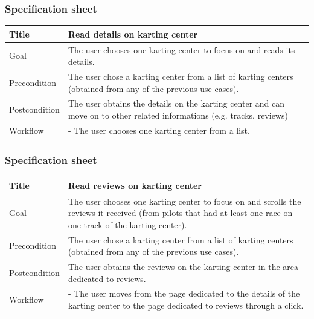 \documentclass{beamer}
\begin{document}
\begin{frame}
    \frametitle{Specification sheet}
    \begin{table}
        \tiny
        \begin{tabular}{|p{2cm}|p{6cm}|}
        \hline
        Title & \textbf{Read details on karting center} \\
        \hline
        Goal & The user chooses one karting center to focus on and reads its details. \\
        \hline
        Precondition & The user chose a karting center from a list of karting centers (obtained from any of the previous use cases).\\
        \hline
        Postcondition & The user obtains the details on the karting center and can move on to other related informations (e.g. tracks, reviews)\\
        \hline
        Workflow &
        - The user chooses one karting center from a list. \\
        \hline
        \end{tabular}
\end{table}
\end{frame}

\begin{frame}
    \frametitle{Specification sheet}
    \begin{table}
        \tiny
        \begin{tabular}{|p{2cm}|p{6cm}|}
        \hline
        Title & \textbf{Read reviews on karting center} \\
        \hline
        Goal & The user chooses one karting center to focus on and scrolls the reviews it received (from pilots
        that had at least one race on one track of the karting center). \\
        \hline
        Precondition & The user chose a karting center from a list of karting centers (obtained from any of the previous use cases).\\
        \hline
        Postcondition & The user obtains the reviews on the karting center in the area dedicated to reviews. \\
        \hline
        Workflow &
        - The user moves from the page dedicated to the details of the karting center to the
        page dedicated to reviews through a click. \\
        \hline
        \end{tabular}
\end{table}
\end{frame}
\end{document}
